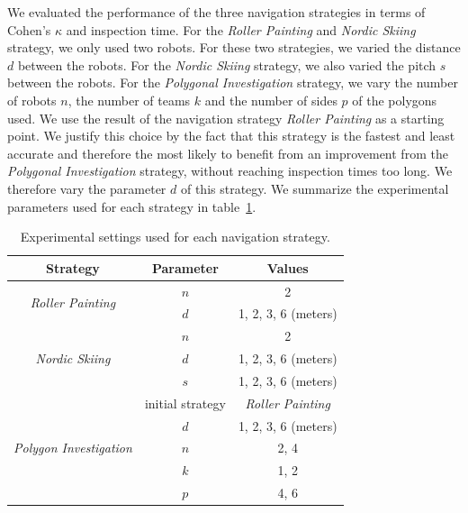 \documentclass[english,RandD]{rapportPFE}  %
\begin{document}
		We evaluated the performance of the three navigation strategies in terms of Cohen's $\kappa$ and inspection time.
		For the \textit{Roller Painting} and \textit{Nordic Skiing} strategy, we only used two robots.
		For these two strategies, we varied the distance $d$ between the robots.
		For the \textit{Nordic Skiing} strategy, we also varied the pitch $s$ between the robots.
		For the \textit{Polygonal Investigation} strategy, we vary the number of robots $n$, the number of teams $k$ and the number of sides $p$ of the polygons used.
		We use the result of the navigation strategy \textit{Roller Painting} as a starting point.
		We justify this choice by the fact that this strategy is the fastest and least accurate and therefore the most likely to benefit from an improvement from the \textit{Polygonal Investigation} strategy, without reaching inspection times too long.
		We therefore vary the parameter $d$ of this strategy.
		We summarize the experimental parameters used for each strategy in table~\ref{tab:exp_params}.

		\begin{table}[h!]
			\centering
			\begin{tabular}{|c|c|c|}
				\hline
				Strategy & Parameter & Values \\
				\hline
				\multirow{2}{*}{\textit{Roller Painting}} & $n$ & 2 \\
				& $d$ & 1, 2, 3, 6 (meters) \\
				\hline
				\multirow{3}{*}{\textit{Nordic Skiing}} & $n$ & 2 \\
				& $d$ & 1, 2, 3, 6 (meters) \\
				& $s$ & 1, 2, 3, 6 (meters) \\
				\hline
				\multirow{5}{*}{\textit{Polygon Investigation}} & initial strategy & \textit{Roller Painting} \\
				& $d$ & 1, 2, 3, 6 (meters) \\
				& $n$ & 2, 4 \\
				& $k$ & 1, 2 \\
				& $p$ & 4, 6 \\
				\hline
			\end{tabular}
			\caption{Experimental settings used for each navigation strategy.}
			\label{tab:exp_params}
		\end{table}
\end{document}
